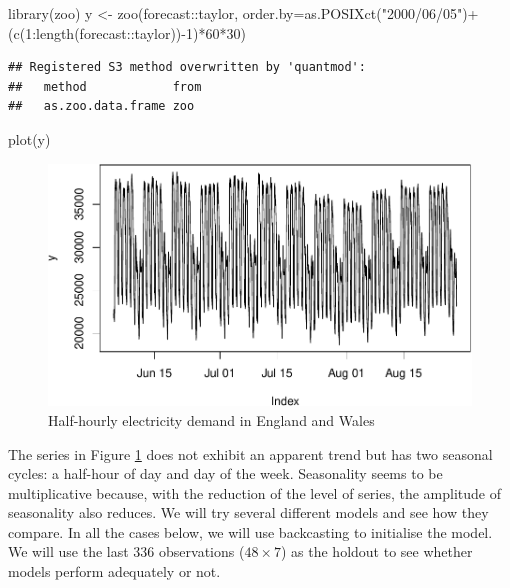 \documentclass[
]{book}
\newenvironment{Shaded}{\begin{snugshade}}{\end{snugshade}}
\newcommand{\AttributeTok}[1]{\textcolor[rgb]{0.77,0.63,0.00}{#1}}
\newcommand{\DecValTok}[1]{\textcolor[rgb]{0.00,0.00,0.81}{#1}}
\newcommand{\FunctionTok}[1]{\textcolor[rgb]{0.00,0.00,0.00}{#1}}
\newcommand{\NormalTok}[1]{#1}
\newcommand{\OtherTok}[1]{\textcolor[rgb]{0.56,0.35,0.01}{#1}}
\newcommand{\SpecialCharTok}[1]{\textcolor[rgb]{0.00,0.00,0.00}{#1}}
\newcommand{\StringTok}[1]{\textcolor[rgb]{0.31,0.60,0.02}{#1}}
\theoremstyle{definition}
\theoremstyle{definition}
\theoremstyle{definition}
\theoremstyle{definition}
\theoremstyle{remark}
\begin{document}
\begin{Shaded}
\begin{Highlighting}[]
\FunctionTok{library}\NormalTok{(zoo)}
\NormalTok{y }\OtherTok{\textless{}{-}} \FunctionTok{zoo}\NormalTok{(forecast}\SpecialCharTok{::}\NormalTok{taylor,}
         \AttributeTok{order.by=}\FunctionTok{as.POSIXct}\NormalTok{(}\StringTok{"2000/06/05"}\NormalTok{)}\SpecialCharTok{+}
\NormalTok{           (}\FunctionTok{c}\NormalTok{(}\DecValTok{1}\SpecialCharTok{:}\FunctionTok{length}\NormalTok{(forecast}\SpecialCharTok{::}\NormalTok{taylor))}\SpecialCharTok{{-}}\DecValTok{1}\NormalTok{)}\SpecialCharTok{*}\DecValTok{60}\SpecialCharTok{*}\DecValTok{30}\NormalTok{)}
\end{Highlighting}
\end{Shaded}

\begin{verbatim}
## Registered S3 method overwritten by 'quantmod':
##   method            from
##   as.zoo.data.frame zoo
\end{verbatim}

\begin{Shaded}
\begin{Highlighting}[]
\FunctionTok{plot}\NormalTok{(y)}
\end{Highlighting}
\end{Shaded}

\begin{figure}
\centering
\includegraphics{Svetunkov--2022----ADAM_files/figure-latex/taylorSeries-1.pdf}
\caption{\label{fig:taylorSeries}Half-hourly electricity demand in England and Wales}
\end{figure}

The series in Figure \ref{fig:taylorSeries} does not exhibit an apparent trend but has two seasonal cycles: a half-hour of day and day of the week. Seasonality seems to be multiplicative because, with the reduction of the level of series, the amplitude of seasonality also reduces. We will try several different models and see how they compare. In all the cases below, we will use backcasting to initialise the model. We will use the last 336 observations (\(48 \times 7\)) as the holdout to see whether models perform adequately or not.
\end{document}
